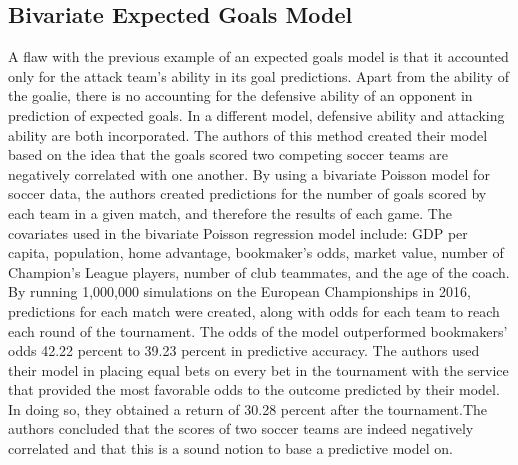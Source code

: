 \documentclass[sigconf]{acmart}
\begin{document}
\subsection{Bivariate Expected Goals Model}
A flaw with the previous example of an expected goals model is that it accounted only for the attack team's ability in its goal predictions. Apart from the ability of the goalie, there is no accounting for the defensive ability of an opponent in prediction of expected goals. In a different model, defensive ability and attacking ability are both incorporated. The authors of this method created their model based on the idea that the goals scored two competing soccer teams are negatively correlated with one another. By using a bivariate Poisson model for soccer data, the authors created predictions for the number of goals scored by each team in a given match, and therefore the results of each game\cite{BivariateExpected}. The covariates used in the bivariate Poisson regression model include: GDP per capita, population, home advantage, bookmaker's odds, market value, number of Champion's League players, number of club teammates, and the age of the coach. By running 1,000,000 simulations on the European Championships in 2016, predictions for each match were created, along with odds for each team to reach each round of the tournament. The odds of the model outperformed bookmakers' odds 42.22 percent to 39.23 percent in predictive accuracy\cite{BivariateExpected}. The authors used their model in placing equal bets on every bet in the tournament with the service that provided the most favorable odds to the outcome predicted by their model. In doing so, they obtained a return of 30.28 percent after the tournament.The authors concluded that the scores of two soccer teams are indeed negatively correlated and that this is a sound notion to base a predictive model on\cite{BivariateExpected}.
\end{document}
